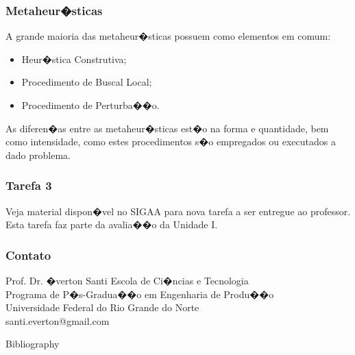 \documentclass[fleqn]{beamer}
\begin{document}
\begin{frame}
	\frametitle{Metaheur�sticas}
	A grande maioria das metaheur�sticas possuem como elementos em comum:
	\begin{itemize}
		\item Heur�stica Construtiva;
		\item Procedimento de Buscal Local;
		\item Procedimento de Perturba��o.
	\end{itemize}
	As diferen�as entre as metaheur�sticas est�o na forma e quantidade, bem como intensidade, como estes procedimentos s�o empregados ou executados a dado problema.
\end{frame}
\begin{frame}
	\frametitle{Tarefa 3}
	Veja material dispon�vel no SIGAA para nova tarefa a ser entregue ao professor. Esta tarefa faz parte da avalia��o da Unidade I.
\end{frame}

\begin{frame}
	\frametitle{Contato}
	\begin{block}{Prof. Dr. �verton Santi}
		Escola de Ci�ncias e Tecnologia\\
		Programa de P�s-Gradua��o em Engenharia de Produ��o\\
		Universidade Federal do Rio Grande do Norte \\
		santi.everton@gmail.com
	\end{block}
\end{frame}
\begin{frame}[allowframebreaks]{Bibliography}
	
	
\end{frame}
\end{document}
